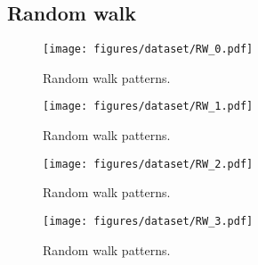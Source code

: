 \subsection{Random walk}
\begin{figure}[H]
    \centering
    \texttt{[image: figures/dataset/RW\_0.pdf]}
    \caption{Random walk patterns.}
    \label{fig:R0}
\end{figure}
\begin{figure}[H]
    \centering
    \texttt{[image: figures/dataset/RW\_1.pdf]}
    \caption{Random walk patterns.}
    \label{fig:R1}
\end{figure}
\begin{figure}[H]
    \centering
    \texttt{[image: figures/dataset/RW\_2.pdf]}
    \caption{Random walk patterns.}
    \label{fig:R2}
\end{figure}
\begin{figure}[H]
    \centering
    \texttt{[image: figures/dataset/RW\_3.pdf]}
    \caption{Random walk patterns.}
    \label{fig:R3}
\end{figure}


